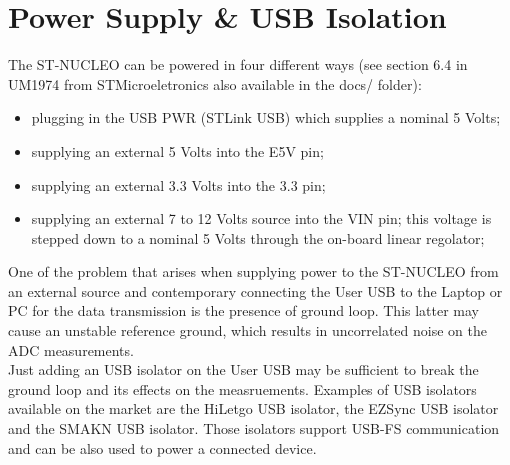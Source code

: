 \documentclass[letterpaper,10pt,english]{hitec}
\begin{document}
\newpage

\section{Power Supply \& USB Isolation}

The ST-NUCLEO can be powered in four different ways (see section 6.4 in UM1974 from STMicroeletronics also available in the docs/ folder):
\begin{itemize}
\item plugging in the USB PWR (STLink USB) which supplies a nominal 5 Volts; 
\item supplying an external 5 Volts into the E5V pin;
\item supplying an external 3.3 Volts into the 3.3 pin;
\item supplying an external 7 to 12 Volts source into the VIN pin; this voltage is stepped down to a nominal 5 Volts through the on-board linear regolator;
\end{itemize}

One of the problem that arises when supplying power to the ST-NUCLEO from an external source and contemporary connecting the User USB to the Laptop or PC for the data transmission is the presence of ground loop. This latter may cause an unstable reference ground, which results in uncorrelated noise on the ADC measurements. \\
Just adding an USB isolator on the User USB may be sufficient to break the ground loop and its effects on the measruements.
Examples of USB isolators available on the market are the HiLetgo USB isolator, the EZSync USB isolator and the SMAKN USB isolator. Those isolators support USB-FS communication and can be also used to power a connected device.


\end{document}
